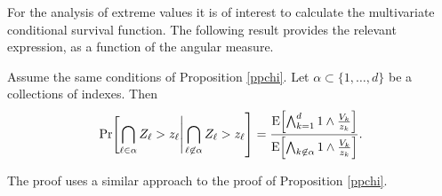 For the analysis of extreme values it is of interest to calculate the multivariate conditional survival function. The following result provides the relevant expression, as a function of the angular measure.
\begin{prop}
Assume the same conditions of Proposition \ref{ppchi}. 
Let $\alpha \subset \{1, \ldots ,d\}$ be a collections of indexes. 
Then     
\begin{equation} \label{eqn:condsurv}
    \mathrm{Pr}\left[\bigcap_{\ell \in \alpha} Z_\ell > z_\ell \right|\left. \bigcap_{\ell\not\in\alpha} Z_\ell > z_\ell\right] =
      \frac{\expect{\bigwedge_{k = 1}^d 1\wedge \frac{V_k}{z_k}}}{\expect{\bigwedge_{k \not\in\alpha}1\wedge\frac{V_k}{z_k}}}.
  \end{equation}
\end{prop}  
The proof uses a similar approach to the proof of Proposition \ref{ppchi}.

